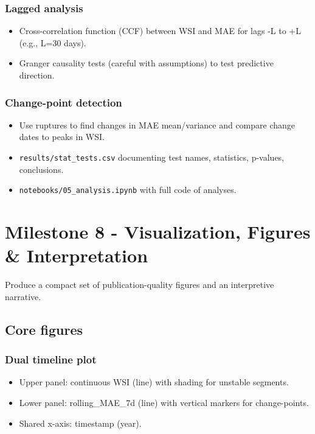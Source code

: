\documentclass[11pt,a4paper]{article}
\begin{document}
\subsubsection{Lagged analysis}
\begin{itemize}
    \item Cross-correlation function (CCF) between WSI and MAE for lags -L to +L (e.g., L=30 days).
    \item Granger causality tests (careful with assumptions) to test predictive direction.
\end{itemize}

\subsubsection{Change-point detection}
\begin{itemize}
    \item Use ruptures to find changes in MAE mean/variance and compare change dates to peaks in WSI.
\end{itemize}

\begin{deliverablebox}
\begin{itemize}
    \item \texttt{results/stat\_tests.csv} documenting test names, statistics, p-values, conclusions.
    \item \texttt{notebooks/05\_analysis.ipynb} with full code of analyses.
\end{itemize}
\end{deliverablebox}

\section{Milestone 8 - Visualization, Figures \& Interpretation}

\begin{objectivebox}
Produce a compact set of publication-quality figures and an interpretive narrative.
\end{objectivebox}

\subsection{Core figures}

\subsubsection{Dual timeline plot}
\begin{itemize}
    \item Upper panel: continuous WSI (line) with shading for unstable segments.
    \item Lower panel: rolling\_MAE\_7d (line) with vertical markers for change-points.
    \item Shared x-axis: timestamp (year).
\end{itemize}
\end{document}

